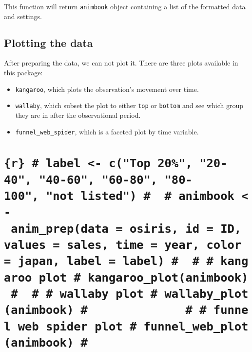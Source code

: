 This function will return \texttt{animbook} object containing a list of the formatted data and settings.

\hypertarget{plotting-the-data}{%
\subsection{Plotting the data}\label{plotting-the-data}}

After preparing the data, we can not plot it. There are three plots available in this package:

\begin{itemize}
\tightlist
\item
  \texttt{kangaroo}, which plots the observation's movement over time.
\item
  \texttt{wallaby}, which subset the plot to either \texttt{top} or \texttt{bottom} and see which group they are in after the observational period.
\item
  \texttt{funnel\_web\_spider}, which is a faceted plot by time variable.
\end{itemize}

\hypertarget{r-label---ctop-20-20-40-40-60-60-80-80-100-not-listed-animbook---anim_prepdata-osiris-id-id-values-sales-time-year-color-japan-label-label-kangaroo-plot-kangaroo_plotanimbook-wallaby-plot-wallaby_plotanimbook-funnel-web-spider-plot-funnel_web_plotanimbook}{%
\section{\texorpdfstring{\texttt{\{r\}\ \#\ label\ \textless{}-\ c("Top\ 20\%",\ "20-40",\ "40-60",\ "60-80",\ "80-100",\ "not\ listed")\ \#\ \ \#\ animbook\ \textless{}-\ anim\_prep(data\ =\ osiris,\ id\ =\ ID,\ values\ =\ sales,\ time\ =\ year,\ color\ =\ japan,\ label\ =\ label)\ \#\ \ \#\ \#\ kangaroo\ plot\ \#\ kangaroo\_plot(animbook)\ \#\ \ \#\ \#\ wallaby\ plot\ \#\ wallaby\_plot(animbook)\ \#\ \ \ \ \ \ \ \ \ \ \ \ \ \ \#\ \#\ funnel\ web\ spider\ plot\ \#\ funnel\_web\_plot(animbook)\ \#}}{\{r\} \# label \textless- c("Top 20\%", "20-40", "40-60", "60-80", "80-100", "not listed") \#  \# animbook \textless- anim\_prep(data = osiris, id = ID, values = sales, time = year, color = japan, label = label) \#  \# \# kangaroo plot \# kangaroo\_plot(animbook) \#  \# \# wallaby plot \# wallaby\_plot(animbook) \#              \# \# funnel web spider plot \# funnel\_web\_plot(animbook) \#}}\label{r-label---ctop-20-20-40-40-60-60-80-80-100-not-listed-animbook---anim_prepdata-osiris-id-id-values-sales-time-year-color-japan-label-label-kangaroo-plot-kangaroo_plotanimbook-wallaby-plot-wallaby_plotanimbook-funnel-web-spider-plot-funnel_web_plotanimbook}}


